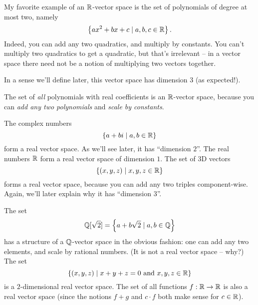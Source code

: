 \begin{example}
	My favorite example of an $\mathbb R$-vector space is the
	set of polynomials of degree at most two, namely
	\[ \left\{ ax^2+bx+c \mid a,b,c \in \mathbb R \right\}. \]
	Indeed, you can add any two quadratics, and multiply by constants.
	You can't multiply two quadratics to get a quadratic,
	but that's irrelevant -- in a vector space there need not
	be a notion of multiplying two vectors together.

	In a sense we'll define later, this vector space
	has dimension $3$ (as expected!).
	\label{example:quadratic_vector_space}
\end{example}
\begin{example}
	The set of \emph{all} polynomials with real coefficients is an
	$\mathbb R$-vector space, because you can \emph{add any two polynomials}
	and \emph{scale by constants}.
\end{example}

\begin{example}
	\listhack
	\begin{enumerate}[(a)]
		\ii The complex numbers
		\[ \left\{ a+bi \mid a,b \in \mathbb R \right\} \]
		form a real vector space. As we'll see later,
		it has ``dimension $2$''.
		\ii The real numbers $\mathbb R$ form a real vector space of dimension $1$.
		\ii The set of 3D vectors
		\[ \left\{ (x,y,z) \mid x,y,z \in \mathbb R \right\} \]
		forms a real vector space, because you can add any two triples
		component-wise. Again, we'll later explain
		why it has ``dimension $3$''.
	\end{enumerate}
\end{example}

\begin{example}
	\listhack
	\begin{enumerate}[(a)]
		\ii The set \[ \mathbb Q[\sqrt 2] = \left\{ a + b \sqrt 2 \mid a, b \in \mathbb Q \right\} \]
		has a structure of a $\mathbb Q$-vector space in the obvious fashion:
		one can add any two elements, and scale by rational numbers.
		(It is not a real vector space -- why?)
		\ii The set \[ \left\{ (x,y,z) \mid x+y+z = 0 \text{ and } x,y,z \in \mathbb R \right\} \]
		is a $2$-dimensional real vector space.
		\ii The set of all functions $f : \mathbb R \to \mathbb R$ is also a real vector space
		(since the notions $f+g$ and $c \cdot f$ both make sense for $c \in \mathbb R$).
	\end{enumerate}
\end{example}

